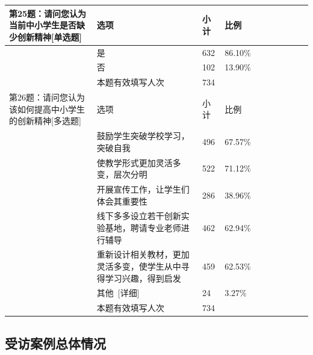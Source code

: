 \documentclass[12pt,UTF8]{ctexart}
\begin{document}
{\begin{spacing}{01}
\begin{longtable}{p{3.5cm}p{2cm}p{1.5cm}p{1.5cm}p{1.5cm}p{1.5cm}p{1.5cm}p{1cm}}
			第25题：请问您认为当前中小学生是否缺少创新精神[单选题] & 选项 & 小计 & 比例 & ~ & ~ & ~ & ~ \\ \hline
			~ & 是 & 632 & 86.10\% & ~ & ~ & ~ & ~ \\ \hline
			~ & 否 & 102 & 13.90\% & ~ & ~ & ~ & ~ \\ \hline
			~ & 本题有效填写人次 & 734 & ~ & ~ & ~ & ~ & ~ \\ \hline
			第26题：请问您认为该如何提高中小学生的创新精神[多选题] & 选项 & 小计 & 比例 & ~ & ~ & ~ & ~ \\ \hline
			~ & 鼓励学生突破学校学习，突破自我 & 496 & 67.57\% & ~ & ~ & ~ & ~ \\ \hline
			~ & 使教学形式更加灵活多变，层次分明 & 522 & 71.12\% & ~ & ~ & ~ & ~ \\ \hline
			~ & 开展宣传工作，让学生们体会其重要性 & 286 & 38.96\% & ~ & ~ & ~ & ~ \\ \hline
			~ & 线下多多设立若干创新实验基地，聘请专业老师进行辅导 & 462 & 62.94\% & ~ & ~ & ~ & ~ \\ \hline
			~ & 重新设计相关教材，更加灵活多变，使学生从中寻得学习兴趣，得到启发 & 459 & 62.53\% & ~ & ~ & ~ & ~ \\ \hline
			~ & 其他 [详细] & 24 & 3.27\% & ~ & ~ & ~ & ~ \\ \hline
			~ & 本题有效填写人次 & 734 & ~ & ~ & ~ & ~ & ~ \\ \hline
		\end{longtable}
	\end{spacing}
	
}

\subsection{受访案例总体情况}
\end{document}
